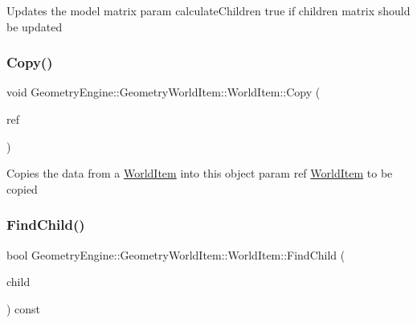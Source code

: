 Updates the model matrix param calculate\+Children true if children matrix should be updated \mbox{\label{class_geometry_engine_1_1_geometry_world_item_1_1_world_item_aa7fdb225408eb03fcf542cbee76a435f}} 
\subsubsection{\texorpdfstring{Copy()}{Copy()}}
{\footnotesize\ttfamily void Geometry\+Engine\+::\+Geometry\+World\+Item\+::\+World\+Item\+::\+Copy (\begin{DoxyParamCaption}\item[{const \mbox{\hyperlink{class_geometry_engine_1_1_geometry_world_item_1_1_world_item}{World\+Item}} \&}]{ref }\end{DoxyParamCaption})\hspace{0.3cm}{\ttfamily [virtual]}}

Copies the data from a \mbox{\hyperlink{class_geometry_engine_1_1_geometry_world_item_1_1_world_item}{World\+Item}} into this object param ref \mbox{\hyperlink{class_geometry_engine_1_1_geometry_world_item_1_1_world_item}{World\+Item}} to be copied \mbox{\label{class_geometry_engine_1_1_geometry_world_item_1_1_world_item_adcdcc221a212ff59ca34c8c7c96e69c7}} 
\subsubsection{\texorpdfstring{FindChild()}{FindChild()}}
{\footnotesize\ttfamily bool Geometry\+Engine\+::\+Geometry\+World\+Item\+::\+World\+Item\+::\+Find\+Child (\begin{DoxyParamCaption}\item[{\mbox{\hyperlink{class_geometry_engine_1_1_geometry_world_item_1_1_world_item}{World\+Item}} $\ast$}]{child }\end{DoxyParamCaption}) const}

